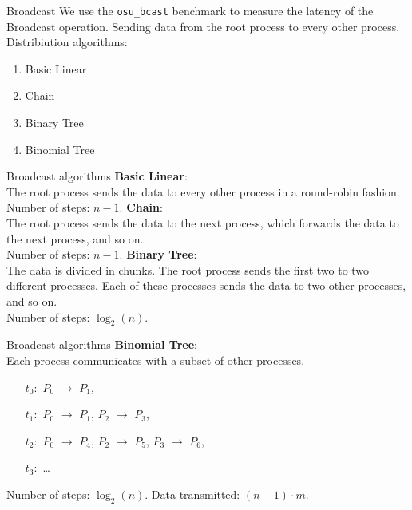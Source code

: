 %
%
\begin{frame}[fragile]{Broadcast}
    We use the \texttt{osu\_bcast} benchmark to measure the latency
    of the Broadcast operation. Sending data from the root process
    to every other process. \\
    Distribiution algorithms:
    \begin{enumerate}
        \item Basic Linear
        \item Chain
        \item Binary Tree
        \item Binomial Tree
    \end{enumerate}
\end{frame}
\begin{frame}[fragile]{Broadcast algorithms}
    \textbf{Basic Linear}: \\
    The root process sends the data to every other process in 
    a round-robin fashion. \\
    Number of steps: $n-1$.
    \vspace*{.25cm}
    \textbf{Chain}: \\
    The root process sends the data to the next process, which forwards
    the data to the next process, and so on. \\
    Number of steps: $n-1$.
    \vspace*{.25cm}
    \textbf{Binary Tree}: \\
    The data is divided in chunks. The root process sends the first two
    to two different processes. Each of these processes sends the data
    to two other processes, and so on. \\
    Number of steps: $\log_2(n)$.
\end{frame}
\begin{frame}[fragile]{Broadcast algorithms}
    \textbf{Binomial Tree}: \\
    Each process communicates with a subset of other processes.
    \begin{enumerate}
        \item[$t_0:$] $P_0$ $\rightarrow$ $P_1$,
        \item[$t_1:$] $P_0$ $\rightarrow$ $P_1$, $P_2$ $\rightarrow$ $P_3$,
        \item[$t_2:$] $P_0$ $\rightarrow$ $P_4$, $P_2$ $\rightarrow$ $P_5$, $P_3$ $\rightarrow$ $P_6$,
        \item[$t_3:$] \dots
    \end{enumerate}
    Number of steps: $\log_2(n)$. Data transmitted: $(n-1) \cdot m$.
\end{frame}
